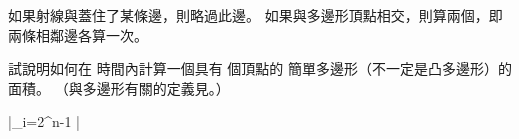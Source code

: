 \startANSWER
如果射線與蓋住了某條邊，則略過此邊。
如果與多邊形頂點相交，則算兩個，即兩條相鄰邊各算一次。
\stopANSWER

\startEXERCISE
試說明如何在  時間內計算一個具有  個頂點的
簡單多邊形（不一定是凸多邊形）的面積。
（與多邊形有關的定義見\inexercise[33.1-5]。）
\stopEXERCISE

\startANSWER
\startformula
{} \left|\sum_{i=2}^{n-1}  \times {} \right|
\stopformula
\stopANSWER

\stopsection
